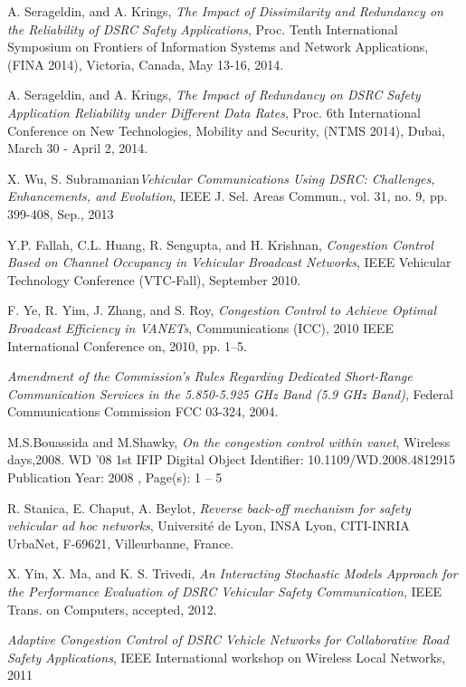 \documentclass[runningheads,a4paper]{llncs}
\begin{document}
\begin{thebibliography}{4}
	 A. Serageldin, and A. Krings, {\em The Impact of Dissimilarity and Redundancy on the Reliability of DSRC Safety Applications}, Proc. Tenth International Symposium on Frontiers of Information Systems and Network Applications, (FINA 2014), Victoria, Canada, May 13-16, 2014.
	
	A. Serageldin, and A. Krings, {\em The Impact of Redundancy on DSRC Safety Application Reliability under Different Data Rates}, Proc. 6th International Conference on New Technologies, Mobility and Security, (NTMS 2014), Dubai, March 30 - April 2, 2014.
	
	X. Wu, S. Subramanian{\em Vehicular Communications Using DSRC: Challenges, Enhancements, and Evolution}, IEEE J. Sel. Areas Commun., vol. 31, no. 9, pp. 399-408, Sep., 2013
	
	Y.P. Fallah, C.L. Huang, R. Sengupta, and H. Krishnan, {\em Congestion Control Based on Channel Occupancy in	Vehicular Broadcast Networks}, IEEE Vehicular Technology Conference (VTC-Fall), September 2010. 
	
	F. Ye, R. Yim, J. Zhang, and S. Roy, {\em Congestion Control to Achieve Optimal Broadcast Efficiency in VANETs}, Communications (ICC),
	2010 IEEE International Conference on, 2010, pp. 1–5.
	
	{\em Amendment of the Commission's Rules Regarding Dedicated Short-Range Communication Services in the 5.850-5.925 GHz Band (5.9 GHz Band)}, Federal Communications Commission FCC 03-324, 2004.
	
	M.S.Bouassida and M.Shawky, {\em On the congestion control within vanet}, Wireless days,2008. WD '08 1st IFIP Digital Object Identifier: 10.1109/WD.2008.4812915 Publication Year: 2008 , Page(s): 1 – 5
	
	R. Stanica, E. Chaput, A. Beylot, {\em Reverse back-off mechanism for safety vehicular ad hoc networks}, Université de Lyon, INSA Lyon, CITI-INRIA UrbaNet, F-69621, Villeurbanne, France.
	
	X. Yin, X. Ma, and K. S. Trivedi, {\em An Interacting Stochastic Models Approach for the Performance Evaluation of DSRC Vehicular Safety Communication}, IEEE Trans. on Computers, accepted, 2012.	
	
	{\em Adaptive Congestion Control of DSRC Vehicle
	Networks for Collaborative Road Safety
	Applications}, IEEE International workshop on Wireless Local Networks, 2011 
	

\end{thebibliography}
\end{document}
